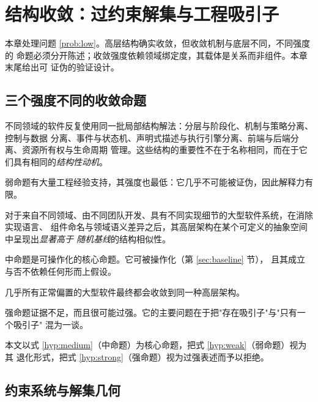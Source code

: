 \chapter[结构收敛]{结构收敛：过约束解集与工程吸引子}\label{ch:convergence}

本章处理问题 \ref{prob:low}。高层结构确实收敛，但收敛机制与底层不同，不同强度的
命题必须分开陈述；收敛强度依赖领域绑定度，其载体是关系而非组件。本章末尾给出可
证伪的验证设计。

\section{三个强度不同的收敛命题}\label{sec:three-claims}

\begin{hypothesis}\label{hyp:weak}
不同领域的软件反复使用同一批局部结构解法：分层与阶段化、机制与策略分离、控制与数据
分离、事件与状态机、声明式描述与执行引擎分离、前端与后端分离、资源所有权与生命周期
管理。这些结构的重要性不在于名称相同，而在于它们具有相同的\emph{结构性动机}。
\end{hypothesis}

弱命题有大量工程经验支持，其强度也最低：它几乎不可能被证伪，因此解释力有限。

\begin{hypothesis}\label{hyp:medium}
对于来自不同领域、由不同团队开发、具有不同实现细节的大型软件系统，在消除实现语言、
组件命名与领域语义差异之后，其高层架构在某个可定义的抽象空间中呈现出\emph{显著高于
随机基线}的结构相似性。
\end{hypothesis}

中命题是可操作化的核心命题。它可被操作化（第 \ref{sec:baseline} 节），
且其成立与否不依赖任何形而上假设。

\begin{hypothesis}\label{hyp:strong}
几乎所有正常偏置的大型软件最终都会收敛到同一种高层架构。
\end{hypothesis}

强命题证据不足，而且很可能过强。它的主要问题在于把"存在吸引子"与"只有一个吸引子"
混为一谈。

本文以式 \ref{hyp:medium}（中命题）为核心命题，把式 \ref{hyp:weak}（弱命题）视为其
退化形式，把式 \ref{hyp:strong}（强命题）视为过强表述而予以拒绝。

\section{约束系统与解集几何}\label{sec:overconstrain}

